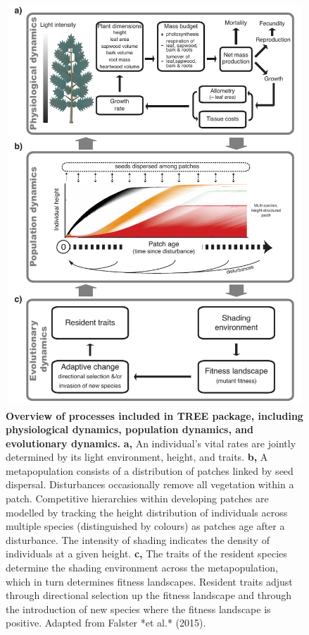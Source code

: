 \documentclass[]{article}
\begin{document}
\begin{figure}[h!]
\centering
\includegraphics[width=15cm,height=15cm,keepaspectratio]{output/schematic}
\caption{\textbf{Overview of processes included in TREE package,
including physiological dynamics, population dynamics, and evolutionary
dynamics.} \textbf{a,} An individual's vital rates are jointly
determined by its light environment, height, and traits. \textbf{b,} A
metapopulation consists of a distribution of patches linked by seed
dispersal. Disturbances occasionally remove all vegetation within a
patch. Competitive hierarchies within developing patches are modelled by
tracking the height distribution of individuals across multiple species
(distinguished by colours) as patches age after a disturbance. The
intensity of shading indicates the density of individuals at a given
height. \textbf{c,} The traits of the resident species determine the
shading environment across the metapopulation, which in turn determines
fitness landscapes. Resident traits adjust through directional selection
up the fitness landscape and through the introduction of new species
where the fitness landscape is positive. Adapted from Falster *et al.* (2015).
\label{fig:schematic}}
\end{figure}
\end{document}
